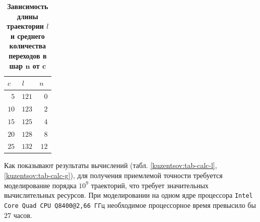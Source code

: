 \begin{table}



\vspace{-5mm}

\center\small%

   \caption{\bf Зависимость длины траектории $l$ и среднего количества переходов в шар $\boldsymbol n$ от $\boldsymbol c$}\label{kuzn:tab-c-n}%






\begin{tabular}{r|r|r}

        \hline

        \footnotesize $c$~& \footnotesize $l$~~& \footnotesize $n$~\\

        \hline

        \rule{0mm}{12pt}%

        $5$&$121$&$0$\\

        $10$&$123$&$2$\\

        $15$&$125$&$4$\\

        $20$&$128$&$8$\\

        $25$&$132$&$12$\\

        \hline

    \end{tabular}

\label{kuzn:tab-c-n}


   \end{table}



    Как показывают результаты вычислений (табл. \ref{kuzentsov:tab-calc-l}, \ref{kuzentsov:tab-calc-g}), для получения приемлемой точности требуется моделирование порядка $10^9$ траекторий, что требует значительных вычислительных ресурсов. При моделировании на одном ядре процессора {\tt Intel\textregistered{} Core Quad CPU Q8400@2,66\,ГГц} необходимое процессорное время превысило бы $27$ часов.



